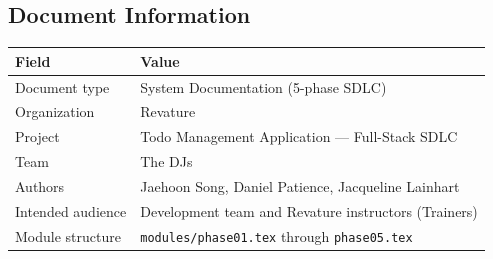 \vspace{1.2cm}
\subsection*{Document Information}
\begin{tabularx}{\textwidth}{@{} l X @{}}
  \toprule
  \textbf{Field} & \textbf{Value} \\
  \midrule
  Document type     & System Documentation (5-phase SDLC) \\
  Organization      & Revature \\
  Project           & Todo Management Application --- Full-Stack SDLC \\
  Team              & The DJs \\
  Authors           & Jaehoon Song, Daniel Patience, Jacqueline Lainhart \\
  Intended audience & Development team and Revature instructors (Trainers) \\
  Module structure  & \texttt{modules/phase01.tex} through \texttt{phase05.tex} \\
  \bottomrule
\end{tabularx}

\newpage
